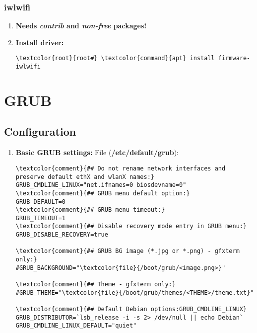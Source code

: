 \documentclass[10pt, a4paper, onecolumn, openany]{book} %
\begin{document}
\subsection{iwlwifi}
\begin{enumerate}
    \item \textbf{Needs \textit{contrib} and \textit{non-free} packages!}
    \item \textbf{Install driver:}
\begin{Verbatim}[commandchars=\\\{\}]
\textcolor{root}{root#} \textcolor{command}{apt} install firmware-iwlwifi
\end{Verbatim}
\end{enumerate}
\chapter{GRUB}
\section{Configuration}
\begin{enumerate}
    \item \textbf{Basic GRUB settings:}
\newline File (\textbf{\textcolor{file}{/etc/default/grub}}):
\begin{Verbatim}[commandchars=\\\{\}]
\textcolor{comment}{## Do not rename network interfaces and preserve default ethX and wlanX names:}
GRUB_CMDLINE_LINUX="net.ifnames=0 biosdevname=0"
\textcolor{comment}{## GRUB menu default option:}
GRUB_DEFAULT=0
\textcolor{comment}{## GRUB menu timeout:}
GRUB_TIMEOUT=1
\textcolor{comment}{## Disable recovery mode entry in GRUB menu:}
GRUB_DISABLE_RECOVERY=true

\textcolor{comment}{## GRUB BG image (*.jpg or *.png) - gfxterm only:}
#GRUB_BACKGROUND="\textcolor{file}{/boot/grub/<image.png>}"

\textcolor{comment}{## Theme - gfxterm only:}
#GRUB_THEME="\textcolor{file}{/boot/grub/themes/<THEME>/theme.txt}"

\textcolor{comment}{## Default Debian options:GRUB_CMDLINE_LINUX}
GRUB_DISTRIBUTOR=`lsb_release -i -s 2> /dev/null || echo Debian`
GRUB_CMDLINE_LINUX_DEFAULT="quiet"
\end{Verbatim}
\end{enumerate}
\end{document}

